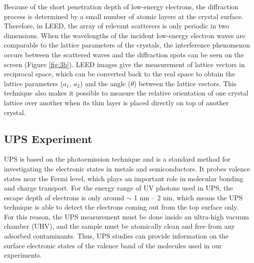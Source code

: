 \documentclass[12pt]{article}
\begin{document}
Because of the short penetration depth of low-energy electrons, the diffraction process is determined by a small number of atomic layers at the crystal surface. Therefore, in LEED, the array of relevant scatterers is only periodic in two dimensions. When the wavelengths of the incident low-energy electron waves are comparable to the lattice parameters of the crystals, the interference phenomenon occurs between the scattered waves and the diffraction spots can be seen on the screen (Figure \ref{fig:3b}). LEED images give the measurement of lattice vectors in reciprocal space, which can be converted back to the real space to obtain the lattice parameters ($a_1$, $a_2$) and the angle ($\theta$) between the lattice vectors. This technique also makes it possible to measure the relative orientation of one crystal lattice over another when its thin layer is placed directly on top of another crystal.

\subsection{UPS Experiment}

UPS is based on the photoemission technique and is a standard method for investigating the electronic states in metals and semiconductors. It probes valence states near the Fermi level, which plays an important role in molecular bonding and charge transport. For the energy range of UV photons used in UPS, the escape depth of electrons is only around $\sim$ 1 nm – 2 nm, which means the UPS technique is able to detect the electrons coming out from the top surface only. For this reason, the UPS measurement must be done inside an ultra-high vacuum chamber (UHV), and the sample must be atomically clean and free from any adsorbed contaminants. Thus, UPS studies can provide information on the surface electronic states of the valence band of the molecules used in our experiments. 
\end{document}
